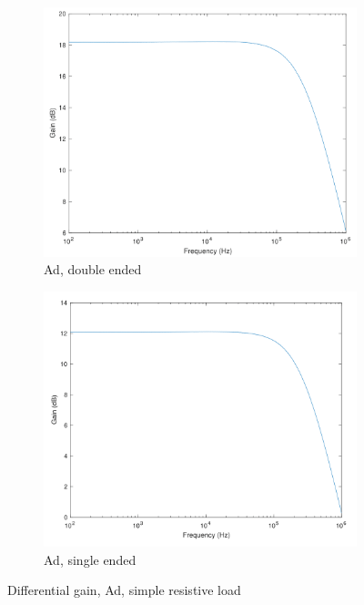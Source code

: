 \begin{figure}[H]
    \centering
    \begin{subfigure}[b]{0.45\textwidth}
        \centering
        \includegraphics[width=\textwidth]{ExperimentalImplementation/Resist_Ad_simple_doubleended.png}
        \caption{Ad, double ended}
        \label{fig:blue_led}
    \end{subfigure}
    \hfill
    \begin{subfigure}[b]{0.45\textwidth}
        \centering
        \includegraphics[width=\textwidth]{ExperimentalImplementation/Ad_resist_simple_singleended.png}
        \caption{Ad, single ended}
        \label{fig:blue_led}
    \end{subfigure}
    \caption{Differential gain, Ad, simple resistive load}
    \label{fig:resloadAdsimple}
\end{figure} 

